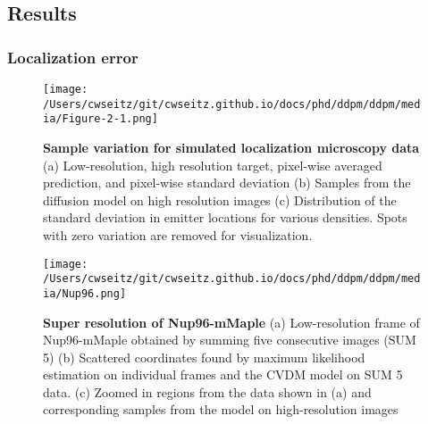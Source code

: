 

\subsection{Results}

\subsubsection{Localization error}

\begin{figure}[t]
\centering
\texttt{[image: /Users/cwseitz/git/cwseitz.github.io/docs/phd/ddpm/ddpm/media/Figure-2-1.png]}
\caption{\textbf{Sample variation for simulated localization microscopy data} (a) Low-resolution, high resolution target, pixel-wise averaged prediction, and pixel-wise standard deviation (b) Samples from the diffusion model on high resolution images (c) Distribution of the standard deviation in emitter locations for various densities. Spots with zero variation are removed for visualization. }
\label{fig:locobayes}
\end{figure}

\begin{figure}[t]
\centering
\texttt{[image: /Users/cwseitz/git/cwseitz.github.io/docs/phd/ddpm/ddpm/media/Nup96.png]}
\caption{\textbf{Super resolution of Nup96-mMaple} (a) Low-resolution frame of Nup96-mMaple obtained by summing five consecutive images (SUM 5) (b) Scattered coordinates found by maximum likelihood estimation on individual frames and the CVDM model on SUM 5 data. (c) Zoomed in regions from the data shown in (a) and corresponding samples from the model on high-resolution images}
\label{fig:nup96}
\end{figure}


